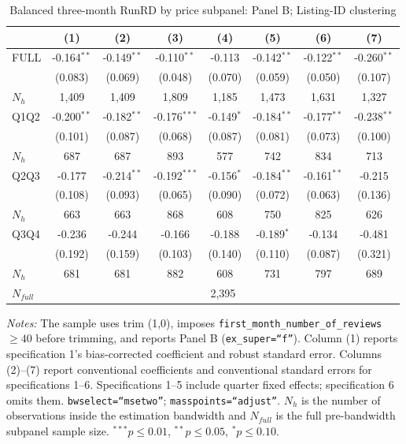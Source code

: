 \begin{table}[!htbp]
\centering
\caption{Balanced three-month RunRD by price subpanel: Panel B; Listing-ID clustering}
\scriptsize
\setlength{\tabcolsep}{5pt}
\begin{tabular}{l*{7}{c}}
\toprule
 & (1) & (2) & (3) & (4) & (5) & (6) & (7) \\
\midrule
FULL & -0.164$^{**}$ & -0.149$^{**}$ & -0.110$^{**}$ & -0.113 & -0.142$^{**}$ & -0.122$^{**}$ & -0.260$^{**}$ \\
 & (0.083) & (0.069) & (0.048) & (0.070) & (0.059) & (0.050) & (0.107) \\
$N_h$ & 1,409 & 1,409 & 1,809 & 1,185 & 1,473 & 1,631 & 1,327 \\
\addlinespace
Q1Q2 & -0.200$^{**}$ & -0.182$^{**}$ & -0.176$^{***}$ & -0.149$^{*}$ & -0.184$^{**}$ & -0.177$^{**}$ & -0.238$^{**}$ \\
 & (0.101) & (0.087) & (0.068) & (0.087) & (0.081) & (0.073) & (0.100) \\
$N_h$ & 687 & 687 & 893 & 577 & 742 & 834 & 713 \\
\addlinespace
Q2Q3 & -0.177 & -0.214$^{**}$ & -0.192$^{***}$ & -0.156$^{*}$ & -0.184$^{**}$ & -0.161$^{**}$ & -0.215 \\
 & (0.108) & (0.093) & (0.065) & (0.090) & (0.072) & (0.063) & (0.136) \\
$N_h$ & 663 & 663 & 868 & 608 & 750 & 825 & 626 \\
\addlinespace
Q3Q4 & -0.236 & -0.244 & -0.166 & -0.188 & -0.189$^{*}$ & -0.134 & -0.481 \\
 & (0.192) & (0.159) & (0.103) & (0.140) & (0.110) & (0.087) & (0.321) \\
$N_h$ & 681 & 681 & 882 & 608 & 731 & 797 & 689 \\

\midrule
$N_{full}$ & \multicolumn{7}{c}{2,395} \\
\bottomrule
\end{tabular}
\begin{minipage}{0.98\textwidth}
\footnotesize
\textit{Notes:} The sample uses trim (1,0), imposes \texttt{first\_month\_number\_of\_reviews}$\geq40$ before trimming, and reports Panel B (\texttt{ex\_super=``f''}). Column (1) reports specification 1's bias-corrected coefficient and robust standard error. Columns (2)--(7) report conventional coefficients and conventional standard errors for specifications 1--6. Specifications 1--5 include quarter fixed effects; specification 6 omits them. \texttt{bwselect=``msetwo''}; \texttt{masspoints=``adjust''}. $N_h$ is the number of observations inside the estimation bandwidth and $N_{full}$ is the full pre-bandwidth subpanel sample size. $^{***}p\leq0.01$, $^{**}p\leq0.05$, $^{*}p\leq0.10$.
\end{minipage}
\end{table}
\clearpage
